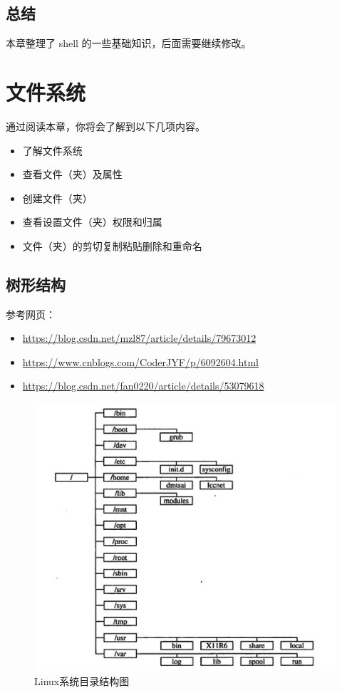 \documentclass[doctor,openright,twoside]{sjtuthesis}
\providecommand{\tightlist}{%
    \setlength{\itemsep}{0pt}\setlength{\parskip}{0pt}}
\theoremstyle{plain}
\theoremstyle{definition}
\theoremstyle{remark}
\theoremstyle{ocrenumbox}
\theoremstyle{plain}
\begin{document}
\hypertarget{section-57}{%
\section{总结}\label{section-57}}

本章整理了 shell 的一些基础知识，后面需要继续修改。

\hypertarget{chap:filesystem}{%
\chapter{文件系统}\label{chap:filesystem}}

通过阅读本章，你将会了解到以下几项内容。

\begin{itemize}
\tightlist
\item
  了解文件系统
\item
  查看文件（夹）及属性
\item
  创建文件（夹）
\item
  查看设置文件（夹）权限和归属
\item
  文件（夹）的剪切复制粘贴删除和重命名
\end{itemize}

\hypertarget{section-58}{%
\section{树形结构}\label{section-58}}

参考网页：

\begin{itemize}
\tightlist
\item
  \url{https://blog.csdn.net/mzl87/article/details/79673012}
\item
  \url{https://www.cnblogs.com/CoderJYF/p/6092604.html}
\item
  \url{https://blog.csdn.net/fan0220/article/details/53079618}
\end{itemize}

\begin{figure}
\centering
\includegraphics{images/linux-fs-tree.png}
\caption{Linux系统目录结构图}
\end{figure}
\end{document}

